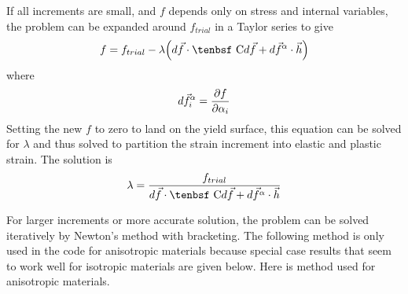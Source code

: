 \documentclass[11pt]{article}
\def\C{\hbox{\tenbsf C}}
\def\df{d \vec{f}}
\def\dfa{d \vec{f}^\alpha}
\begin{document}
If all increments are small, and $f$ depends only on stress and internal variables, the problem can be expanded around $f_{trial}$ in a Taylor series to give
\begin{equation}
    f  = f_{trial} - \lambda\Bigl( \df \cdot \C \df + \dfa \cdot \vec h \Bigr)
\end{equation}
where
\begin{equation}
\dfa_i = {\partial f\over \partial\alpha_i}
\end{equation}
Setting the new $f$ to zero to land on the yield surface, this equation can be solved for $\lambda$ and thus solved to partition the strain increment into elastic and plastic strain. The solution is
\begin{equation}
        \lambda = { f_{trial}   \over  \df\cdot \C\df + \dfa \cdot \vec h }     \label{lambdaInitial}
\end{equation}

For larger increments or more accurate solution, the problem can be solved iteratively by Newton's method with bracketing. The following method is only used in the code for anisotropic materials because special case results that seem to work well for isotropic materials are given below. Here is method used for anisotropic materials.
\end{document}
